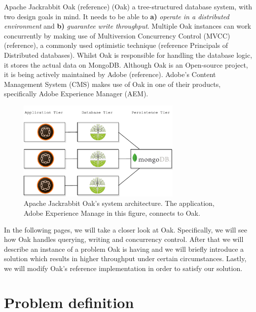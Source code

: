 \documentclass[abstracton,12pt]{scrreprt}
\begin{document}

Apache Jackrabbit Oak (reference) (Oak) a tree-structured database system, with two design goals in mind.
It needs to be able to \textbf{a)} \textit{operate in a distributed environment} and \textbf{b)} \textit{guarantee write throughput}.
Multiple Oak instances can work concurrently by making use of Multiversion Concurrency Control (MVCC) (reference), a commonly used optimistic technique (reference Principals of Distributed databases).
Whilst Oak is responsible for handling the database logic, it stores the actual data on MongoDB.
Although Oak is an Open-source project, it is being actively maintained by Adobe (reference).
Adobe's Content Management System (CMS) makes use of Oak in one of their products, specifically Adobe Experience Manager (AEM).

\begin{figure}[h]
    \centering
    \includegraphics[width=8cm]{architecture}
    \caption{Apache Jackrabbit Oak's system architecture. The application, Adobe Experience Manage in this figure, connects to Oak.}
    \label{fig:architecture}
\end{figure}

In the following pages, we will take a closer look at Oak.
Specifically, we will see how Oak handles querying, writing and concurrency control.
After that we will describe an instance of a problem Oak is having and we will briefly introduce a solution which results in higher throughput under certain circumstances.
Lastly, we will modify Oak's reference implementation in order to satisfy our solution.

\chapter{Problem definition}
\end{document}
